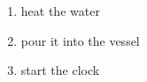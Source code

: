 \begin{enumerate}[label=(\alph*), noitemsep]
    \item heat the water
    \item pour it into the vessel
    \item start the clock
\end{enumerate}
